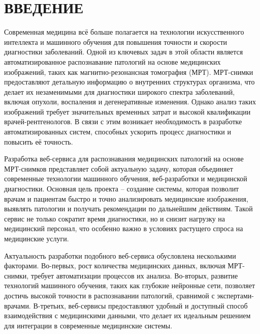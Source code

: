 \sectionbreak \section*{ 
    \gostTitleFont
    \redline
    ВВЕДЕНИЕ
}

\subtitlespace

{\gostFont

\par \redline Современная медицина всё больше полагается на технологии искусственного интеллекта и машинного обучения для повышения точности и скорости диагностики заболеваний. Одной из ключевых задач в этой области является автоматизированное распознавание патологий на основе медицинских изображений, таких как магнитно-резонансная томография (МРТ). МРТ-снимки предоставляют детальную информацию о внутренних структурах организма, что делает их незаменимыми для диагностики широкого спектра заболеваний, включая опухоли, воспаления и дегенеративные изменения. Однако анализ таких изображений требует значительных временных затрат и высокой квалификации врачей-рентгенологов. В связи с этим возникает необходимость в разработке автоматизированных систем, способных ускорить процесс диагностики и повысить её точность.

\par \redline Разработка веб-сервиса для распознавания медицинских патологий на основе МРТ-снимков представляет собой актуальную задачу, которая объединяет современные технологии машинного обучения, веб-разработки и медицинской диагностики. Основная цель проекта – создание системы, которая позволит врачам и пациентам быстро и точно анализировать медицинские изображения, выявлять патологии и получать рекомендации по дальнейшим действиям. Такой сервис не только сократит время диагностики, но и снизит нагрузку на медицинский персонал, что особенно важно в условиях растущего спроса на медицинские услуги.

\par \redline Актуальность разработки подобного веб-сервиса обусловлена несколькими факторами. Во-первых, рост количества медицинских данных, включая МРТ-снимки, требует автоматизации процессов их анализа. Во-вторых, развитие технологий машинного обучения, таких как глубокие нейронные сети, позволяет достичь высокой точности в распознавании патологий, сравнимой с экспертами-врачами. В-третьих, веб-сервисы предоставляют удобный и доступный способ взаимодействия с медицинскими данными, что делает их идеальным решением для интеграции в современные медицинские системы.

}
